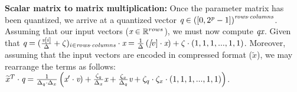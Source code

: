 \textbf{Scalar matrix to matrix multiplication: } Once the parameter matrix has been quantized, we arrive at a quantized vector $ \emph{q} \in  \left([0, 2^{\emph{p}} - 1]\right)^{ \emph{rows} \cdot \emph{columns} }$. Assuming that our input vectors ($ \emph{x} \in \mathbb{R}^{rows} $), we must now compute $ \emph{q} \emph{x} $. Given that $ \emph{q} = ( \frac{ \emph{v}[i] }{ \Delta} + \zeta )_{i \in \emph{rows}\cdot\emph{columns}} \cdot \emph{x} = \frac{1}{\Delta} \left(  \emph[v] \cdot \emph{x} \right) + \zeta \cdot (1,1,1,...,1,1) $. Moreover, assuming that the input vectors are encoded in compressed format ($\widetilde{{x}}$), we may rearrange the terms as follows: 
$ \widetilde{{x}}^{T} \cdot \emph{q} = \frac	{1}{\Delta_q \cdot \Delta_x} \left( \emph{x}' \cdot \emph{v} ) + \frac{\zeta_q}{\Delta_x} \emph{x} + \frac{\zeta_x}{\Delta_q} \emph{v} + \zeta_q \cdot \zeta_x \cdot (1,1,1,...,1,1) \right)$.

%
%
%
%
%
